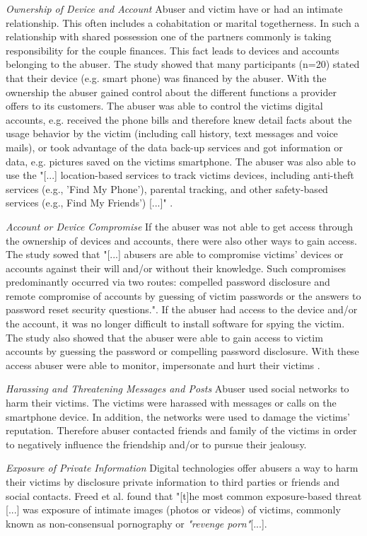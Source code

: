 \textit{Ownership of Device and Account}
Abuser and victim have or had an intimate relationship. This often includes a cohabitation or  marital togetherness. In such a relationship with shared possession one of the partners commonly is taking responsibility for the couple finances. This fact leads to devices and accounts belonging to the abuser.
The study showed that many participants (n=20) stated that their device (e.g. smart phone) was financed by the abuser. 
With the ownership the abuser gained control about the different functions a provider offers to its customers. The abuser was able to control the victims digital accounts, e.g. received the phone bills and therefore knew detail facts about the usage behavior by the victim (including call history, text messages and voice mails), or took advantage of the data back-up services and got information or data, e.g. pictures saved on the victims smartphone. The abuser was also able to use the "[...] location-based services to track victims devices, including anti-theft services (e.g., 'Find My Phone'), parental tracking, and other safety-based services (e.g., Find My Friends') [...]" \cite{freed2018stalker}.

\textit{Account or Device Compromise}
If the abuser was not able to get access through the ownership of devices and accounts, there were also other ways to gain access. The study sowed that "[...] abusers are able to compromise victims' devices or accounts against their will and/or without their knowledge. Such compromises predominantly occurred via two routes: compelled password disclosure and remote compromise of accounts by guessing of victim passwords or the answers to password reset security questions.". If the abuser had access to the device and/or the account, it was no longer difficult to install software for spying the victim.
The study also showed that the abuser were able to gain access to victim accounts by guessing the password or compelling password disclosure. With these access abuser were able to monitor, impersonate and hurt their victims \cite{freed2018stalker}.

\textit{Harassing and Threatening Messages and Posts}
Abuser used social networks to harm their victims. The victims were harassed with messages or calls on the smartphone device. In addition, the networks were used to damage the victims' reputation.
Therefore abuser contacted friends and family of the victims in order to negatively influence the friendship and/or to pursue their jealousy.

\textit{Exposure of Private Information}
Digital technologies offer abusers a way to harm their victims by disclosure private information to third parties or friends and social contacts. Freed et al. found that "[t]he most common exposure-based threat [...] was exposure of intimate images (photos or videos) of victims, commonly known as non-consensual pornography or \textit{"revenge porn"}[...].

